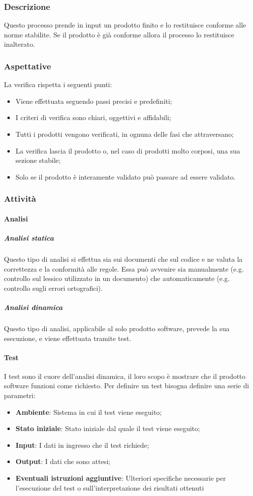 \subsubsection{Descrizione}
Questo processo prende in input un prodotto finito e lo restituisce conforme alle norme stabilite. Se il prodotto è già 
conforme allora il processo lo restituisce inalterato.

\subsubsection{Aspettative}
La verifica rispetta i seguenti punti:
\begin{itemize}
    \item Viene effettuata seguendo passi precisi e predefiniti;
    \item I criteri di verifica sono chiari, oggettivi e affidabili;
    \item Tutti i prodotti vengono verificati, in ognuna delle fasi che attraversano;
    \item La verifica lascia il prodotto o, nel caso di prodotti molto corposi, una sua sezione stabile;
    \item Solo se il prodotto è interamente validato può passare ad essere validato.
\end{itemize}

\subsubsection{Attività}
\paragraph{Analisi}
\subparagraph{Analisi statica}
Questo tipo di analisi si effettua sia sui documenti che sul codice e ne valuta la correttezza e la conformità alle 
regole. Essa può avvenire sia manualmente (e.g. controllo sul lessico utilizzato in un documento) che automaticamente 
(e.g. controllo sugli errori ortografici).
\subparagraph{Analisi dinamica}
Questo tipo di analisi, applicabile al solo prodotto software, prevede la sua esecuzione, e viene effettuata tramite test.

\paragraph{Test}
I test sono il cuore dell'analisi dinamica, il loro scopo è mostrare che il prodotto software funzioni come richiesto. 
Per definire un test bisogna definire una serie di parametri:
\begin{itemize}
    \item \textbf{Ambiente}: Sistema in cui il test viene eseguito;
    \item \textbf{Stato iniziale}: Stato iniziale dal quale il test viene eseguito;
    \item \textbf{Input}: I dati in ingresso che il test richiede;
    \item \textbf{Output}: I dati che sono attesi;
    \item \textbf{Eventuali istruzioni aggiuntive}: Ulteriori specifiche necessarie per l'esecuzione del test o sull'interpretazione dei risultati ottenuti
\end{itemize}

